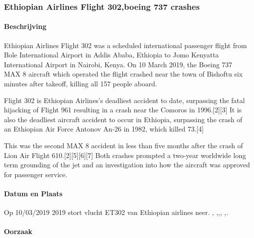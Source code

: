 \documentclass{article}
\begin{document}
	\subsubsection{Ethiopian Airlines Flight 302,boeing 737 crashes}
	
	\paragraph{Beschrijving}
		
	Ethiopian Airlines Flight 302 was a scheduled international passenger flight from Bole International Airport in Addis Ababa, Ethiopia to Jomo Kenyatta International Airport in Nairobi, Kenya. On 10 March 2019, the Boeing 737 MAX 8 aircraft which operated the flight crashed near the town of Bishoftu six minutes after takeoff, killing all 157 people aboard.
	
	Flight 302 is Ethiopian Airlines's deadliest accident to date, surpassing the fatal hijacking of Flight 961 resulting in a crash near the Comoros in 1996.[2][3] It is also the deadliest aircraft accident to occur in Ethiopia, surpassing the crash of an Ethiopian Air Force Antonov An-26 in 1982, which killed 73.[4]
	
	This was the second MAX 8 accident in less than five months after the crash of Lion Air Flight 610.[2][5][6][7] Both crashes prompted a two-year worldwide long term grounding of the jet and an investigation into how the aircraft was approved for passenger service.
	\paragraph{Datum en Plaats}
	\newline \indent  Op  10/03/2019 2019 stort vlucht ET302 van Ethiopian airlines neer.  \cite{gates18112020boeingcrisis},
	\cite{boeing737maxsoftwareprobles},\cite{avetisov19032019boeingmalwarestate},\cite{thompson23112020nationalsecurityboeing},
	\cite{wiki737maxgroundings},\cite{campbell02052019boengcrashhumanerrors}.
	
 
	\paragraph{Oorzaak}
	
\end{document}
